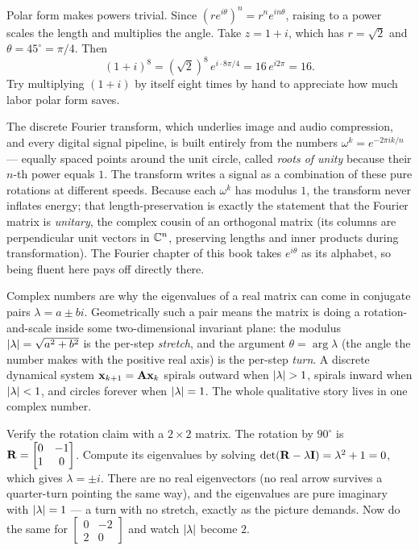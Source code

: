 \begin{example}
\label{ch39:ex-demoivre}
Polar form makes powers trivial. Since $(re^{i\theta})^n = r^n e^{in\theta}$, raising to a power
scales the length and multiplies the angle. Take $z = 1 + i$, which has $r = \sqrt2$ and $\theta =
45^\circ = \pi/4$. Then
\[
(1+i)^8 = (\sqrt2)^8\, e^{i\cdot 8\pi/4} = 16\, e^{i 2\pi} = 16.
\]
Try multiplying $(1+i)$ by itself eight times by hand to appreciate how much labor polar form saves.
\end{example}

\begin{applicationbox}
The discrete Fourier transform, which underlies image and audio compression, and every digital signal pipeline, is
built entirely from the numbers $\omega^k = e^{-2\pi i k/n}$ --- equally spaced points around the unit
circle, called \emph{roots of unity} because their $n$-th power equals $1$. The transform writes a
signal as a combination of these pure rotations at different speeds. Because each $\omega^k$ has
modulus $1$, the transform never inflates energy; that length-preservation is exactly the statement
that the Fourier matrix is \emph{unitary}, the complex cousin of an orthogonal matrix (its columns
are perpendicular unit vectors in $\mathbb{C}^n$, preserving lengths and inner products during transformation).
The Fourier chapter of this book takes $e^{i\theta}$ as its alphabet, so being fluent here pays off
directly there.
\end{applicationbox}

\begin{connectionbox}
Complex numbers are why the eigenvalues of a real matrix can come in conjugate pairs $\lambda =
a \pm bi$. Geometrically such a pair means the matrix is doing a rotation-and-scale inside some
two-dimensional invariant plane: the modulus $\lvert\lambda\rvert = \sqrt{a^2+b^2}$ is the per-step
\emph{stretch}, and the argument $\theta = \arg\lambda$ (the angle the number makes with the
positive real axis) is the per-step \emph{turn}. A discrete dynamical system $\mathbf{x}_{k+1} =
\mathbf{A}\mathbf{x}_k$ spirals outward when $\lvert\lambda\rvert > 1$, spirals inward when $\lvert\lambda\rvert < 1$,
and circles forever when $\lvert\lambda\rvert = 1$. The whole qualitative story lives in one complex number.
\end{connectionbox}

\begin{labbox}
Verify the rotation claim with a $2\times 2$ matrix. The rotation by $90^\circ$ is
$\mathbf{R} = \begin{bmatrix} 0 & -1\\ 1 & 0\end{bmatrix}$. Compute its eigenvalues by solving
$\det(\mathbf{R} - \lambda \mathbf{I}) = \lambda^2 + 1 = 0$, which gives $\lambda = \pm i$. There are no
real eigenvectors (no real arrow survives a quarter-turn pointing the same way), and the eigenvalues
are pure imaginary with $\lvert\lambda\rvert = 1$ --- a turn with no stretch, exactly as the picture
demands. Now do the same for $\begin{bmatrix} 0 & -2\\ 2 & 0\end{bmatrix}$ and watch $\lvert\lambda\rvert$
become $2$.
\end{labbox}


